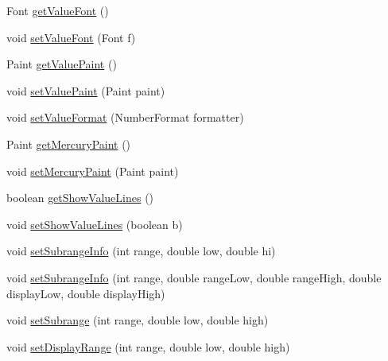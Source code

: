\begin{DoxyCompactItemize}
\item 
Font \mbox{\hyperlink{classorg_1_1jfree_1_1chart_1_1plot_1_1_thermometer_plot_abeef2f4f04d40d398218553181a766c0}{get\+Value\+Font}} ()
\item 
void \mbox{\hyperlink{classorg_1_1jfree_1_1chart_1_1plot_1_1_thermometer_plot_afefe67cc12c7f466060e5149b699bd8a}{set\+Value\+Font}} (Font f)
\item 
Paint \mbox{\hyperlink{classorg_1_1jfree_1_1chart_1_1plot_1_1_thermometer_plot_ae4d7d0cbb2ce0a352a3855c3fa959eb4}{get\+Value\+Paint}} ()
\item 
void \mbox{\hyperlink{classorg_1_1jfree_1_1chart_1_1plot_1_1_thermometer_plot_a347f5e5511e843c2e496019c84c20fd9}{set\+Value\+Paint}} (Paint paint)
\item 
void \mbox{\hyperlink{classorg_1_1jfree_1_1chart_1_1plot_1_1_thermometer_plot_a98363c5152b5b7366fffae7fbabb9656}{set\+Value\+Format}} (Number\+Format formatter)
\item 
Paint \mbox{\hyperlink{classorg_1_1jfree_1_1chart_1_1plot_1_1_thermometer_plot_ad191d4305e54736ab1cf978c8da62266}{get\+Mercury\+Paint}} ()
\item 
void \mbox{\hyperlink{classorg_1_1jfree_1_1chart_1_1plot_1_1_thermometer_plot_a99271f8834744a4540a8ea4c0287104b}{set\+Mercury\+Paint}} (Paint paint)
\item 
boolean \mbox{\hyperlink{classorg_1_1jfree_1_1chart_1_1plot_1_1_thermometer_plot_a8818f4444cbc3cbd0e8cada43d4e3c6f}{get\+Show\+Value\+Lines}} ()
\item 
void \mbox{\hyperlink{classorg_1_1jfree_1_1chart_1_1plot_1_1_thermometer_plot_aacc32926a64c662cf5560bb0cf6f770b}{set\+Show\+Value\+Lines}} (boolean b)
\item 
void \mbox{\hyperlink{classorg_1_1jfree_1_1chart_1_1plot_1_1_thermometer_plot_af084ef3ab50215c9ad46f47bed6add91}{set\+Subrange\+Info}} (int range, double low, double hi)
\item 
void \mbox{\hyperlink{classorg_1_1jfree_1_1chart_1_1plot_1_1_thermometer_plot_ac0cd50754b5117ef9fa6a7ef97097479}{set\+Subrange\+Info}} (int range, double range\+Low, double range\+High, double display\+Low, double display\+High)
\item 
void \mbox{\hyperlink{classorg_1_1jfree_1_1chart_1_1plot_1_1_thermometer_plot_a294e4f5301b1795a22bee171c5e5e402}{set\+Subrange}} (int range, double low, double high)
\item 
void \mbox{\hyperlink{classorg_1_1jfree_1_1chart_1_1plot_1_1_thermometer_plot_a3ac81f9e1ea131f4deb4a09c56460d69}{set\+Display\+Range}} (int range, double low, double high)

\end{DoxyCompactItemize}
